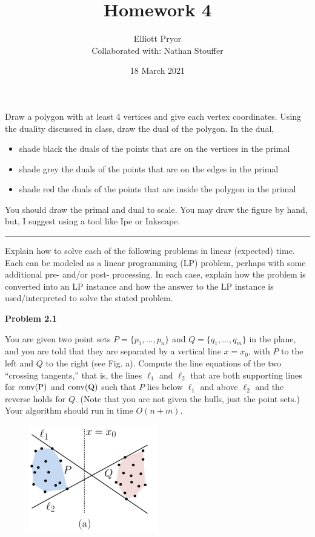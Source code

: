 \documentclass[11pt]{article}
\title{Homework 4}
\author{Elliott Pryor \\
Collaborated with: Nathan Stouffer}
\date{18 March 2021}
\begin{document}
\maketitle



Draw a polygon with at least 4 vertices and give each vertex coordinates.
Using the duality discussed in class, draw the dual of the polygon.  In the
dual,
\begin{itemize}
    \item shade black the duals of the points that are on the vertices in the primal
    \item shade grey the duals of the points that are on the edges in the primal
    \item shade red the duals of the points that are inside the polygon in the primal
\end{itemize}

You should draw the primal and dual to scale.  You may draw the figure by hand,
but, I suggest using a tool like Ipe or Inkscape.
\hrule











Explain how to solve each of the following problems in linear (expected) time.
Each can be modeled as a linear programming (LP) problem, perhaps with some
additional pre- and/or post- processing. In each case, explain how the problem
is converted into an LP instance and how the answer to the LP instance is
used/interpreted to solve the stated problem.



\Large{\textbf{Problem 2.1}}

You are given two point sets $P = \{p_1,\ldots,p_n\}$ and $Q =
\{q_1,\ldots,q_m\}$ in the plane, and you are told that they are
separated by a vertical line $x = x_0$, with $P$ to the left and $Q$ to
the right (see Fig. a). Compute the line equations of the two
``crossing tangents,'' that is, the lines $\ell_1$ and $\ell_2$ that are
both supporting lines for $\rm{conv}(P)$ and $\rm{conv}(Q)$ such that
$P$ lies below $\ell_1$ and above $\ell_2$ and the reverse holds for
$Q$. (Note that you are not given the hulls, just the point sets.) Your
algorithm should run in time $O(n + m)$.

\begin{figure}[h]
  \centering
  \includegraphics[width = 0.5\textwidth]{lp_a.png}
\end{figure}
\end{document}
